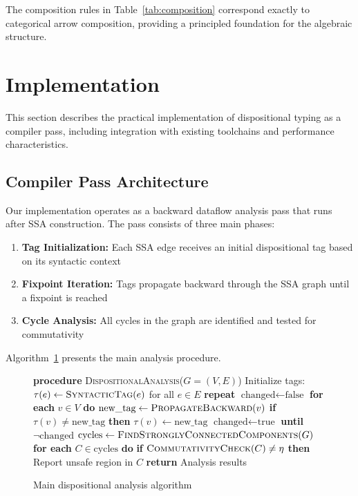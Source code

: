 \documentclass[journal]{IEEEtran}
\begin{document}
The composition rules in Table~\ref{tab:composition} correspond exactly to categorical arrow composition, providing a principled foundation for the algebraic structure.

\section{Implementation}
\label{sec:implementation}

This section describes the practical implementation of dispositional typing as a compiler pass, including integration with existing toolchains and performance characteristics.

\subsection{Compiler Pass Architecture}

Our implementation operates as a backward dataflow analysis pass that runs after SSA construction. The pass consists of three main phases:

\begin{enumerate}
\item \textbf{Tag Initialization:} Each SSA edge receives an initial dispositional tag based on its syntactic context
\item \textbf{Fixpoint Iteration:} Tags propagate backward through the SSA graph until a fixpoint is reached
\item \textbf{Cycle Analysis:} All cycles in the graph are identified and tested for commutativity
\end{enumerate}

Algorithm~\ref{alg:main} presents the main analysis procedure.

\begin{figure}[t]
\begin{algorithmic}[1]
\STATE \textbf{procedure} \textsc{DispositionalAnalysis}($G = (V, E)$)
\STATE Initialize tags: $\tau(e) \leftarrow \textsc{SyntacticTag}(e)$ for all $e \in E$
\STATE \textbf{repeat}
\STATE \quad $\text{changed} \leftarrow \text{false}$
\STATE \quad \textbf{for each} $v \in V$ \textbf{do}
\STATE \quad \quad $\text{new\_tag} \leftarrow \textsc{PropagateBackward}(v)$
\STATE \quad \quad \textbf{if} $\tau(v) \neq \text{new\_tag}$ \textbf{then}
\STATE \quad \quad \quad $\tau(v) \leftarrow \text{new\_tag}$
\STATE \quad \quad \quad $\text{changed} \leftarrow \text{true}$
\STATE \textbf{until} $\neg\text{changed}$
\STATE $\text{cycles} \leftarrow \textsc{FindStronglyConnectedComponents}(G)$
\STATE \textbf{for each} $C \in \text{cycles}$ \textbf{do}
\STATE \quad \textbf{if} $\textsc{CommutativityCheck}(C) \neq \eta$ \textbf{then}
\STATE \quad \quad Report unsafe region in $C$
\STATE \textbf{return} Analysis results
\end{algorithmic}
\caption{Main dispositional analysis algorithm}
\label{alg:main}
\end{figure}
\end{document}

